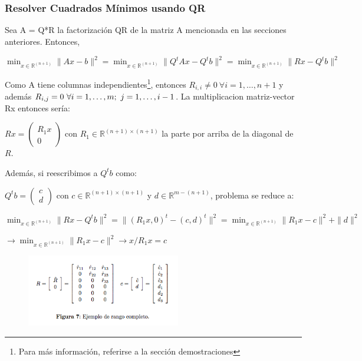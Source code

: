 \subsubsection{Resolver Cuadrados Mínimos usando QR}
Sea A = Q*R la factorización QR de la matriz A mencionada en las secciones anteriores. Entonces, 
\begin{center}
 $\displaystyle \min_{x \in \mathbb{R}^{(n+1)}} \| Ax-b\|^2 = \min_{x \in \mathbb{R}^{(n+1)}} \| Q^tAx-Q^tb \|^2 = \min_{x \in \mathbb{R}^{(n+1)}} \| Rx-Q^tb\|^2$
\end{center}
Como A tiene columnas independientes\footnote{Para más información, referirse a la sección demostraciones}, entonces $R_{i,i} \neq 0 \ \forall i=1,\ldots,n+1$ 
y además {$R_{i,j} = \nobreak 0 \ \forall i=1,\ldots,m; \ j=1,\ldots,i-1 $}. La multiplicacion matriz-vector Rx entonces sería:
\begin{center}
$Rx = \begin{pmatrix}
        R_1x \\
        0
       \end{pmatrix}$ con $R_1 \in \mathbb{R}^{(n+1) \times (n+1)}$ la parte por arriba de la diagonal de $R$.
\end{center}
Además, si reescribimos a $Q^tb$ como:
\begin{center}
$Q^tb = \begin{pmatrix}
        c\\
        d
       \end{pmatrix}$ con $c \in \mathbb{R}^{(n+1) \times (n+1)}$ y $d \in \mathbb{R}^{m-(n+1)}$, problema se reduce a:

$\min_{x \in \mathbb{R}^{(n+1)}} \| Rx-Q^tb\|^2 = \| (R_1x,0)^t -(c,d)^t \|^2 =
\min_{x \in \mathbb{R}^{(n+1)}} \|R_1x-c\|^2+\|d\|^2$

$ \rightarrow \min_{x \in \mathbb{R}^{(n+1)}} \| R_1x-c\|^2 \rightarrow x/ R_1x=c$
\end{center}

\begin{figure}[H] 
\begin{center}
\includegraphics[width=0.6\textwidth]{img/exp-qr.png} 
\end{center}
\end{figure}


